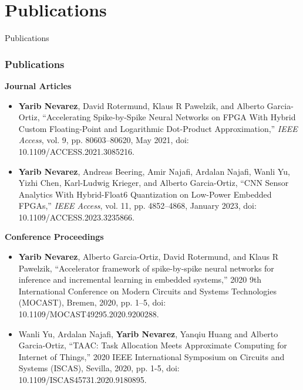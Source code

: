 \section*{Publications}

	\begin{frame}{Publications}
		\frametitle{Publications}
		

		\textbf{Journal Articles}
		\begin{itemize}
			\item \textbf{Yarib Nevarez}, David Rotermund, Klaus R Pawelzik, and Alberto Garcia-Ortiz, ``Accelerating Spike-by-Spike Neural Networks on FPGA With Hybrid Custom Floating-Point and Logarithmic Dot-Product Approximation,'' \textit{IEEE Access}, vol. 9, pp. 80603--80620, May 2021, doi: 10.1109/ACCESS.2021.3085216.
			
			\item \textbf{Yarib Nevarez}, Andreas Beering, Amir Najafi, Ardalan Najafi, Wanli Yu, Yizhi Chen, Karl-Ludwig Krieger, and Alberto Garcia-Ortiz, ``CNN Sensor Analytics With Hybrid-Float6 Quantization on Low-Power Embedded FPGAs,'' \textit{IEEE Access}, vol. 11, pp. 4852--4868, January 2023, doi: 10.1109/ACCESS.2023.3235866.
		\end{itemize}

		\vspace{5mm}
		\textbf{Conference Proceedings}
		\begin{itemize}%
			\item \textbf{Yarib Nevarez}, Alberto Garcia-Ortiz, David Rotermund, and Klaus R Pawelzik, ``Accelerator framework of spike-by-spike neural networks for inference and incremental learning in embedded systems,'' 2020 9th International Conference on Modern Circuits and Systems Technologies (MOCAST), Bremen, 2020, pp. 1--5, doi: 10.1109/MOCAST49295.2020.9200288.
			
			\item Wanli Yu, Ardalan Najafi, \textbf{Yarib Nevarez}, Yanqiu Huang and Alberto Garcia-Ortiz, ``TAAC: Task Allocation Meets Approximate Computing for Internet of Things,'' 2020 IEEE International Symposium on Circuits and Systems (ISCAS), Sevilla, 2020, pp. 1-5, doi: 10.1109/ISCAS45731.2020.9180895.
			
		\end{itemize}
	\end{frame}

